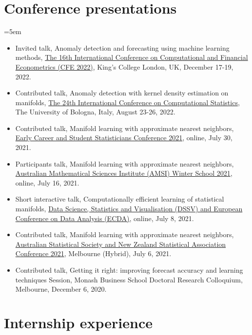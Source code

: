 \documentclass[10pt,a4paper,]{article}
\begin{document}
\section{Conference presentations}\label{conference-presentations-1}

\hangindent=5em

\begin{itemize}
\item
  Invited talk, Anomaly detection and forecasting using machine learning
  methods,
  \href{http://www.cfenetwork.org/CFE2022/index.php}{The 16th International Conference on Computational and Financial Econometrics (CFE 2022)},
  King's College London, UK, December 17-19, 2022.
\item
  Contributed talk, Anomaly detection with kernel density estimation on
  manifolds,
  \href{http://www.compstat2022.org/index.php}{The 24th International Conference on Computational Statistics},
  The University of Bologna, Italy, August 23-26, 2022.
\item
  Contributed talk, Manifold learning with approximate nearest
  neighbors,
  \href{http://ecssc2021.com.au/}{Early Career and Student Statisticians Conference 2021},
  online, July 30, 2021.
\item
  Participants talk, Manifold learning with approximate nearest
  neighbors,
  \href{https://ws.amsi.org.au/}{Australian Mathematical Sciences Institute (AMSI) Winter School 2021},
  online, July 16, 2021.
\item
  Short interactive talk, Computationally efficient learning of
  statistical manifolds,
  \href{https://iasc-isi.org/dssv-ecda2021/}{Data Science, Statistics and Visualisation (DSSV) and European Conference on Data Analysis (ECDA)},
  online, July 8, 2021.
\item
  Contributed talk, Manifold learning with approximate nearest
  neighbors,
  \href{https://anzsc2021.com.au/}{Australian Statistical Society and New Zealand Statistical Association Conference 2021},
  Melbourne (Hybrid), July 6, 2021.
\item
  Contributed talk, Getting it right: improving forecast accuracy and
  learning techniques Session, Monash Business School Doctoral Research
  Colloquium, Melbourne, December 6, 2020.
\end{itemize}

\section{Internship experience}\label{internship-experience-1}
\end{document}
